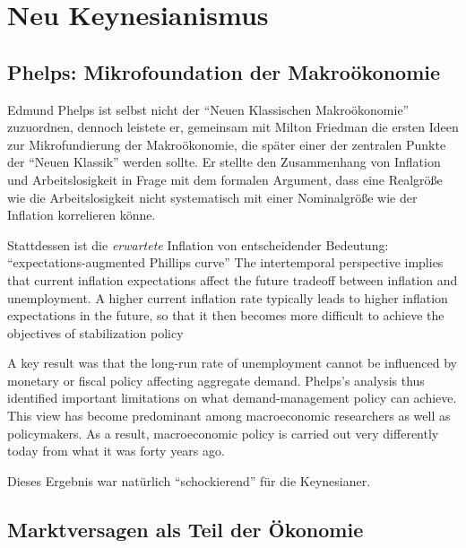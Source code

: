 %
%
%

\chapter{Neu Keynesianismus}

\section{Phelps: Mikrofoundation der Makroökonomie}
\label{micmac}

Edmund Phelps ist selbst nicht der "`Neuen Klassischen Makroökonomie"' zuzuordnen, dennoch leistete er, gemeinsam mit Milton Friedman die ersten Ideen zur Mikrofundierung der Makroökonomie, die später einer der zentralen Punkte der "`Neuen Klassik"' werden sollte. Er stellte den Zusammenhang von Inflation und Arbeitslosigkeit in Frage mit dem formalen Argument, dass eine Realgröße wie die Arbeitslosigkeit nicht systematisch mit einer Nominalgröße wie der Inflation korrelieren könne. 

Stattdessen ist die \textit{erwartete} Inflation von entscheidender Bedeutung:  "`expectations-augmented Phillips 
curve"' The intertemporal perspective implies that current inflation expectations affect the future 
tradeoff between inflation and unemployment. A higher current inflation rate typically leads to 
higher inflation expectations in the future, so that it then becomes more difficult to achieve the 
objectives of stabilization policy

A key result was that the long-run rate of unemployment cannot be influenced 
by monetary or fiscal policy affecting aggregate demand. Phelps’s analysis thus identified 
important limitations on what demand-management policy can achieve. This view has become 
predominant among macroeconomic researchers as well as policymakers. As a result, 
macroeconomic policy is carried out very differently today from what it was forty years ago.

Dieses Ergebnis war natürlich "`schockierend"' für die Keynesianer. 




\section{Marktversagen als Teil der Ökonomie}
\label{Marktversagen}

